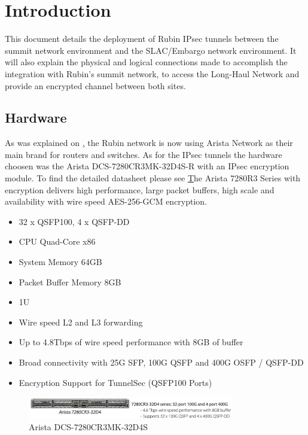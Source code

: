 \section{Introduction}

This document details the deployment of Rubin IPsec tunnels between the summit network environment and the SLAC/Embargo network environment. It will also explain the physical and logical connections made to accomplish the integration with Rubin's summit network, to access the Long-Haul Network and provide an encrypted channel between both sites.


\subsection{Hardware}

As was explained on \href{https://ittn-043.lsst.io/}, the Rubin network is now using Arista Network as their main brand for routers and switches. As for the IPsec tunnels the hardware choosen was the Arista DCS-7280CR3MK-32D4S-R with an IPsec encryption module. 
To find the detailed datasheet please see \href{https://www.arista.com/assets/data/pdf/Datasheets/7280R3-Data-Sheet.pdf}

The Arista 7280R3 Series with encryption delivers high performance, large packet buffers, high scale and availability with wire speed
AES-256-GCM encryption. 

\begin{itemize}
\item 32 x QSFP100, 4 x QSFP-DD
\item CPU Quad-Core x86
\item System Memory 64GB
\item Packet Buffer Memory 8GB
\item 1U
\item Wire speed L2 and L3 forwarding
\item Up to 4.8Tbps of wire speed performance with 8GB of buffer
\item Broad connectivity with 25G SFP, 100G QSFP and 400G OSFP / QSFP-DD
\item Encryption Support for TunnelSec (QSFP100 Ports)
\end{itemize}

\begin{figure}
    \includegraphics[width=9cm]{images/arista_datasheet01.png}
    \centering
    \caption{Arista DCS-7280CR3MK-32D4S}
  \end{figure}

